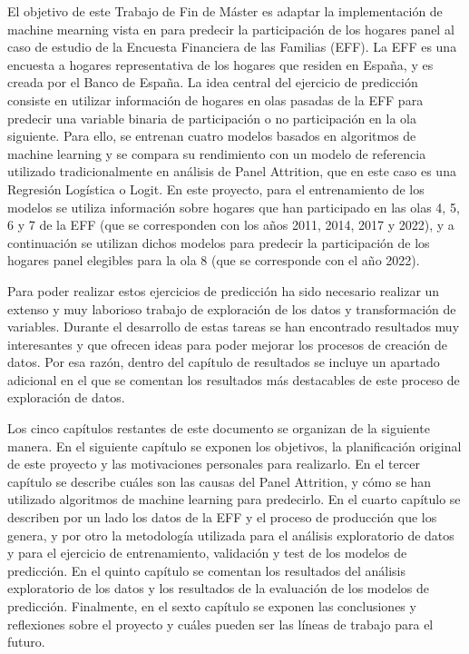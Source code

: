 El objetivo de este Trabajo de Fin de Máster es adaptar la implementación de machine mearning vista en \cite{beste2023case} para predecir la participación de los hogares panel al caso de estudio de la Encuesta Financiera de las Familias (EFF). La EFF es una encuesta a hogares representativa de los hogares que residen en España, y es creada por el Banco de España. La idea central del ejercicio de predicción consiste en utilizar información de hogares en olas pasadas de la EFF para predecir una variable binaria de participación o no participación en la ola siguiente. Para ello, se entrenan cuatro modelos basados en algoritmos de machine learning y se compara su rendimiento con un modelo de referencia utilizado tradicionalmente en análisis de Panel Attrition, que en este caso es una Regresión Logística o Logit. En este proyecto, para el entrenamiento de los modelos se utiliza información sobre hogares que han participado en las olas 4, 5, 6 y 7 de la EFF (que se corresponden con los años 2011, 2014, 2017 y 2022), y a continuación se utilizan dichos modelos para predecir la participación de los hogares panel elegibles para la ola 8 (que se corresponde con el año 2022).

Para poder realizar estos ejercicios de predicción ha sido necesario realizar un extenso y muy laborioso trabajo de exploración de los datos y transformación de variables. Durante el desarrollo de estas tareas se han encontrado resultados muy interesantes y que ofrecen ideas para poder mejorar los procesos de creación de datos. Por esa razón, dentro del capítulo de resultados se incluye un apartado adicional en el que se comentan los resultados más destacables de este proceso de exploración de datos.

Los cinco capítulos restantes de este documento se organizan de la siguiente manera. En el siguiente capítulo se exponen los objetivos, la planificación original de este proyecto y las motivaciones personales para realizarlo. En el tercer capítulo se describe cuáles son las causas del Panel Attrition, y cómo se han utilizado algoritmos de machine learning para predecirlo. En el cuarto capítulo se describen por un lado los datos de la EFF y el proceso de producción que los genera, y por otro la metodología utilizada para el análisis exploratorio de datos y para el ejercicio de entrenamiento, validación y test de los modelos de predicción. En el quinto capítulo se comentan los resultados del análisis exploratorio de los datos y los resultados de la evaluación de los modelos de predicción. Finalmente, en el sexto capítulo se exponen las conclusiones y reflexiones sobre el proyecto y cuáles pueden ser las líneas de trabajo para el futuro.